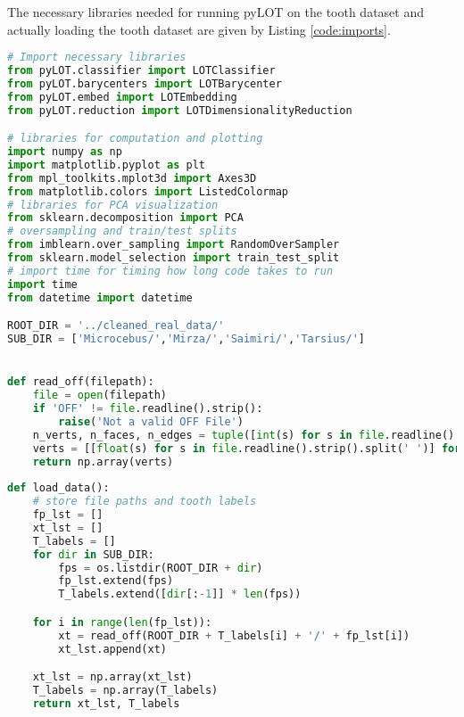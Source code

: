 The necessary libraries needed for running pyLOT on the tooth dataset and actually loading the tooth dataset are given by Listing \ref{code:imports}.

\begin{lstlisting}[language=Python, caption=Import Statements, label={code:imports}]
# Import necessary libraries
from pyLOT.classifier import LOTClassifier
from pyLOT.barycenters import LOTBarycenter
from pyLOT.embed import LOTEmbedding
from pyLOT.reduction import LOTDimensionalityReduction

# libraries for computation and plotting
import numpy as np
import matplotlib.pyplot as plt
from mpl_toolkits.mplot3d import Axes3D
from matplotlib.colors import ListedColormap
# libraries for PCA visualization
from sklearn.decomposition import PCA
# oversampling and train/test splits
from imblearn.over_sampling import RandomOverSampler
from sklearn.model_selection import train_test_split
# import time for timing how long code takes to run
import time
from datetime import datetime

ROOT_DIR = '../cleaned_real_data/'
SUB_DIR = ['Microcebus/','Mirza/','Saimiri/','Tarsius/']


def read_off(filepath):
    file = open(filepath)
    if 'OFF' != file.readline().strip():
        raise('Not a valid OFF File')
    n_verts, n_faces, n_edges = tuple([int(s) for s in file.readline().strip().split(' ')])
    verts = [[float(s) for s in file.readline().strip().split(' ')] for _ in range(n_verts)]
    return np.array(verts)
    
def load_data():
    # store file paths and tooth labels
    fp_lst = []
    xt_lst = []
    T_labels = []
    for dir in SUB_DIR:
        fps = os.listdir(ROOT_DIR + dir)
        fp_lst.extend(fps)
        T_labels.extend([dir[:-1]] * len(fps))

    for i in range(len(fp_lst)):
        xt = read_off(ROOT_DIR + T_labels[i] + '/' + fp_lst[i])
        xt_lst.append(xt)

    xt_lst = np.array(xt_lst)
    T_labels = np.array(T_labels)
    return xt_lst, T_labels

\end{lstlisting}

















